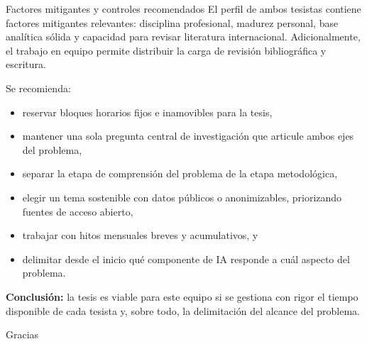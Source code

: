 \documentclass[aspectratio=169]{beamer}
\begin{document}
\begin{frame}{Factores mitigantes y controles recomendados}
\justifying
El perfil de ambos tesistas contiene factores mitigantes relevantes: disciplina profesional, madurez personal, base analítica sólida y capacidad para revisar literatura internacional. Adicionalmente, el trabajo en equipo permite distribuir la carga de revisión bibliográfica y escritura.

\vspace{0.5em}
Se recomienda:
\begin{itemize}[leftmargin=*]
    \item reservar bloques horarios fijos e inamovibles para la tesis,
    \item mantener una sola pregunta central de investigación que articule ambos ejes del problema,
    \item separar la etapa de comprensión del problema de la etapa metodológica,
    \item elegir un tema sostenible con datos públicos o anonimizables, priorizando fuentes de acceso abierto,
    \item trabajar con hitos mensuales breves y acumulativos, y
    \item delimitar desde el inicio qué componente de IA responde a cuál aspecto del problema.
\end{itemize}

\vspace{0.5em}
\textbf{Conclusión:} la tesis es viable para este equipo si se gestiona con rigor el tiempo disponible de cada tesista y, sobre todo, la delimitación del alcance del problema.
\end{frame}

\begin{frame}
\centering
\Large Gracias
\end{frame}
\end{document}
